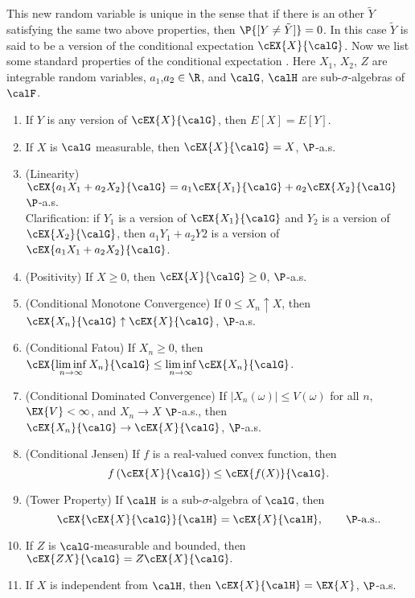 	This new random variable is unique in the sense that if there is an other $\tilde{Y}$ satisfying
the same two above properties, then $\P{[Y\neq \tilde{Y}]}=0$. In this case $\tilde{Y}$ is said to be 
a version of the conditional expectation $\cEX{X}{\calG}$.
Now we list some standard properties of the conditional expectation \cite{Williams1991}.
Here $X_1$, $X_2$, $Z$ are integrable random variables, $a_1$,$a_2\in \R$, and $\calG$, $\calH$ 
are sub-$\sigma$-algebras of $\calF$.
\begin{enumerate}[(E1)]
	\item
		If $Y$ is any version of $\cEX{X}{\calG}$, then $E[X]=E[Y]$.
	\item
		If $X$ is $\calG$ measurable, then $\cEX{X}{\calG} = X$, $\P$-a.s.
	\item
		(Linearity) $\cEX{a_1X_1+a_2X_2}{\calG} = a_1\cEX{X_1}{\calG} + a_2\cEX{X_2}{\calG}$ $\P$-a.s.\\
		Clarification:
			if $Y_1$ is a version of $\cEX{X_1}{\calG}$ and $Y_2$ is a version of $\cEX{X_2}{\calG}$, then
			$a_1Y_1 + a_2Y2$ is a version of $\cEX{a_1 X_1 + a_2X_2}{\calG}$.
	\item
		(Positivity) If $X \geq 0$, then $\cEX{X}{\calG} \geq 0$,  $\P$-a.s.
	\item
		(Conditional Monotone Convergence)
		If $0 \leq X_n \uparrow X$, then $\cEX{X_n}{\calG} \uparrow \cEX{X}{\calG}$, $\P$-a.s.
	\item
		(Conditional Fatou)
		If $X_n\geq 0$, then 
		$\displaystyle
			\cEX{\liminf_{n \to \infty} X_n}{\calG}
			\leq
			\liminf_{n \to \infty}
			\cEX{X_n}{\calG}
		$.
	\item
		(Conditional Dominated Convergence)
		If $|X_n(\omega)|\leq V(\omega)$ for all $n$, $\EX{V}<\infty$, and $X_n \to X$ $\P$-a.s., then
		$\cEX{X_n}{\calG} \to \cEX{X}{\calG}$, $\P$-a.s.
	\item
		(Conditional Jensen)
		If $f$ is a real-valued convex function, then
		$$
			f
			\left(
				\cEX{X}{\calG}
			\right)
			\leq
			\cEX{f(X)}{\calG}.
		$$
		\item
			(Tower Property) If $\calH$ is a sub-$\sigma$-algebra of $\calG$, then
			$$
				\cEX{\cEX{X}{\calG}}{\calH} = \cEX{X}{\calH}, \qquad \P\text{-a.s.}.
			$$
		\item
			If $Z$ is $\calG$-measurable and bounded, then
			$
				\cEX{ZX}{\calG} = Z\cEX{X}{\calG}.
			$
		\item
			If $X$ is independent from $\calH$, then
			$\cEX{X}{\calH} = \EX{X}$, \qquad $\P$-a.s.
\end{enumerate}

